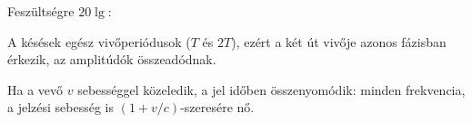 Feszültségre $20\lg$:

\begin{center}\end{center}

A késések egész vivőperiódusok ($T$ és $2T$), ezért a két út vivője azonos fázisban érkezik, az amplitúdók összeadódnak.

\begin{center}\end{center}

\begin{center}\end{center}

Ha a vevő $v$ sebességgel közeledik, a jel időben összenyomódik: minden frekvencia, a jelzési sebesség is $(1+v/c)$-szeresére nő.

\begin{center}\end{center}

